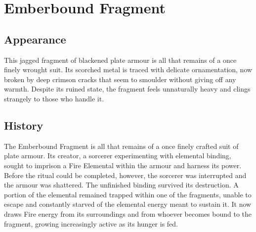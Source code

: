 \ItemCategory{}
\ItemSubCategory{}
\ItemFolder{}

\chapter*{Emberbound Fragment}\label{mi:EmberboundFragment}


\section*{Appearance}
{\entryfont This jagged fragment of blackened plate armour is all that remains of a once finely wrought suit. Its scorched metal is traced with delicate ornamentation, now broken by deep crimson cracks that seem to smoulder without giving off any warmth. Despite its ruined state, the fragment feels unnaturally heavy and clings strangely to those who handle it.}

\section*{History}
{\entryfont The Emberbound Fragment is all that remains of a once finely crafted suit of plate armour. Its creator, a sorcerer experimenting with elemental binding, sought to imprison a Fire Elemental within the armour and harness its power. Before the ritual could be completed, however, the sorcerer was interrupted and the armour was shattered.
The unfinished binding survived its destruction. A portion of the elemental remained trapped within one of the fragments, unable to escape and constantly starved of the elemental energy meant to sustain it. It now draws Fire energy from its surroundings and from whoever becomes bound to the fragment, growing increasingly active as its hunger is fed.}

